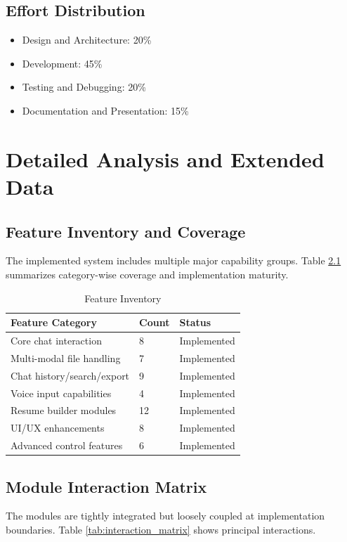 \documentclass[12pt,a4paper]{report}
\begin{document}
\section{Effort Distribution}
\begin{itemize}
  \item Design and Architecture: 20\%
  \item Development: 45\%
  \item Testing and Debugging: 20\%
  \item Documentation and Presentation: 15\%
\end{itemize}

\chapter{Detailed Analysis and Extended Data}
\section{Feature Inventory and Coverage}
The implemented system includes multiple major capability groups. Table \ref{tab:feature_inventory} summarizes category-wise coverage and implementation maturity.

\begin{table}[H]
\centering
\caption{Feature Inventory}
\label{tab:feature_inventory}
\begin{tabular}{|p{2.1in}|p{1.0in}|p{1.3in}|}
\hline
\textbf{Feature Category} & \textbf{Count} & \textbf{Status} \\
\hline
Core chat interaction & 8 & Implemented \\
\hline
Multi-modal file handling & 7 & Implemented \\
\hline
Chat history/search/export & 9 & Implemented \\
\hline
Voice input capabilities & 4 & Implemented \\
\hline
Resume builder modules & 12 & Implemented \\
\hline
UI/UX enhancements & 8 & Implemented \\
\hline
Advanced control features & 6 & Implemented \\
\hline
\end{tabular}
\end{table}

\section{Module Interaction Matrix}
The modules are tightly integrated but loosely coupled at implementation boundaries. Table \ref{tab:interaction_matrix} shows principal interactions.
\end{document}
